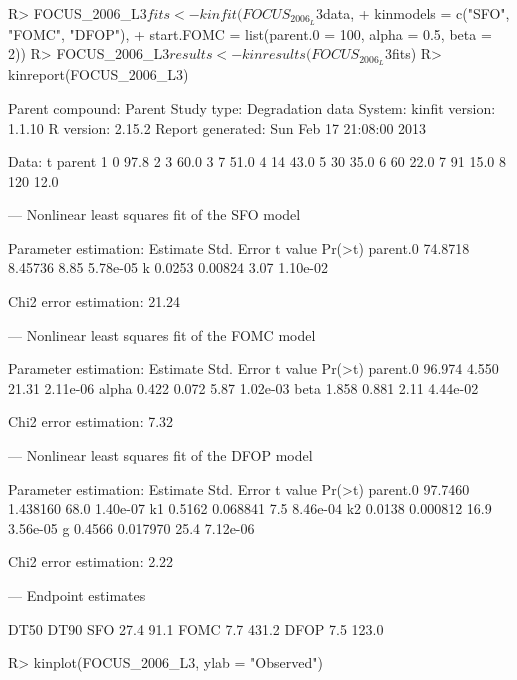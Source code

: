 \documentclass[12pt,a4paper]{article}
\begin{document}
\begin{Schunk}
\begin{Sinput}
R> FOCUS_2006_L3$fits <- kinfit(FOCUS_2006_L3$data, 
+   kinmodels = c("SFO", "FOMC", "DFOP"),
+   start.FOMC = list(parent.0 = 100, alpha = 0.5, beta = 2))
R> FOCUS_2006_L3$results <- kinresults(FOCUS_2006_L3$fits)
R> kinreport(FOCUS_2006_L3)
\end{Sinput}
\begin{Soutput}
Parent compound:  Parent 
Study type:       Degradation data 
System:            
kinfit version:   1.1.10 
R version:        2.15.2 
Report generated: Sun Feb 17 21:08:00 2013 

Data:
    t parent
1   0   97.8
2   3   60.0
3   7   51.0
4  14   43.0
5  30   35.0
6  60   22.0
7  91   15.0
8 120   12.0



---
Nonlinear least squares fit of the SFO model

Parameter estimation:	
         Estimate Std. Error t value   Pr(>t)
parent.0  74.8718    8.45736    8.85 5.78e-05
k          0.0253    0.00824    3.07 1.10e-02

Chi2 error estimation: 21.24 %



---
Nonlinear least squares fit of the FOMC model

Parameter estimation:	
         Estimate Std. Error t value   Pr(>t)
parent.0   96.974      4.550   21.31 2.11e-06
alpha       0.422      0.072    5.87 1.02e-03
beta        1.858      0.881    2.11 4.44e-02

Chi2 error estimation: 7.32 %



---
Nonlinear least squares fit of the DFOP model

Parameter estimation:	
         Estimate Std. Error t value   Pr(>t)
parent.0  97.7460   1.438160    68.0 1.40e-07
k1         0.5162   0.068841     7.5 8.46e-04
k2         0.0138   0.000812    16.9 3.56e-05
g          0.4566   0.017970    25.4 7.12e-06

Chi2 error estimation: 2.22 %



---
Endpoint estimates

     DT50  DT90
SFO  27.4  91.1
FOMC  7.7 431.2
DFOP  7.5 123.0
\end{Soutput}
\begin{Sinput}
R> kinplot(FOCUS_2006_L3, ylab = "Observed")
\end{Sinput}
\end{Schunk}
\end{document}
